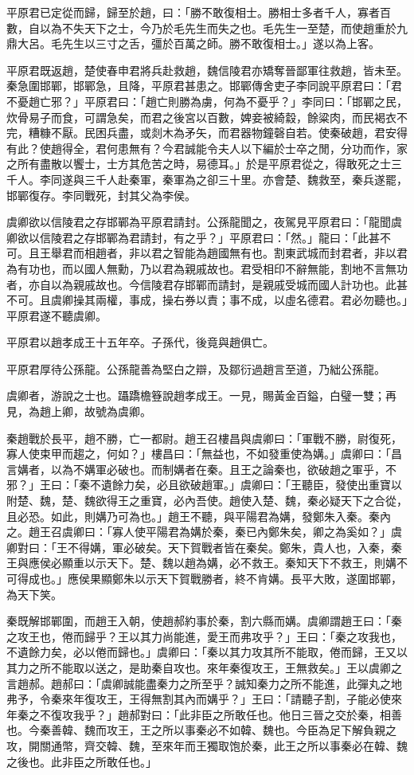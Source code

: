 \begin{pinyinscope}
平原君已定從而歸，歸至於趙，曰：「勝不敢復相士。勝相士多者千人，寡者百數，自以為不失天下之士，今乃於毛先生而失之也。毛先生一至楚，而使趙重於九鼎大呂。毛先生以三寸之舌，彊於百萬之師。勝不敢復相士。」遂以為上客。

平原君既返趙，楚使春申君將兵赴救趙，魏信陵君亦矯奪晉鄙軍往救趙，皆未至。秦急圍邯鄲，邯鄲急，且降，平原君甚患之。邯鄲傳舍吏子李同說平原君曰：「君不憂趙亡邪？」平原君曰：「趙亡則勝為虜，何為不憂乎？」李同曰：「邯鄲之民，炊骨易子而食，可謂急矣，而君之後宮以百數，婢妾被綺縠，餘粱肉，而民褐衣不完，糟糠不厭。民困兵盡，或剡木為矛矢，而君器物鐘磬自若。使秦破趙，君安得有此？使趙得全，君何患無有？今君誠能令夫人以下編於士卒之閒，分功而作，家之所有盡散以饗士，士方其危苦之時，易德耳。」於是平原君從之，得敢死之士三千人。李同遂與三千人赴秦軍，秦軍為之卻三十里。亦會楚、魏救至，秦兵遂罷，邯鄲復存。李同戰死，封其父為李侯。

虞卿欲以信陵君之存邯鄲為平原君請封。公孫龍聞之，夜駕見平原君曰：「龍聞虞卿欲以信陵君之存邯鄲為君請封，有之乎？」平原君曰：「然。」龍曰：「此甚不可。且王舉君而相趙者，非以君之智能為趙國無有也。割東武城而封君者，非以君為有功也，而以國人無勳，乃以君為親戚故也。君受相印不辭無能，割地不言無功者，亦自以為親戚故也。今信陵君存邯鄲而請封，是親戚受城而國人計功也。此甚不可。且虞卿操其兩權，事成，操右券以責；事不成，以虛名德君。君必勿聽也。」平原君遂不聽虞卿。

平原君以趙孝成王十五年卒。子孫代，後竟與趙俱亡。

平原君厚待公孫龍。公孫龍善為堅白之辯，及鄒衍過趙言至道，乃絀公孫龍。

虞卿者，游說之士也。躡蹻檐簦說趙孝成王。一見，賜黃金百鎰，白璧一雙；再見，為趙上卿，故號為虞卿。

秦趙戰於長平，趙不勝，亡一都尉。趙王召樓昌與虞卿曰：「軍戰不勝，尉復死，寡人使束甲而趨之，何如？」樓昌曰：「無益也，不如發重使為媾。」虞卿曰：「昌言媾者，以為不媾軍必破也。而制媾者在秦。且王之論秦也，欲破趙之軍乎，不邪？」王曰：「秦不遺餘力矣，必且欲破趙軍。」虞卿曰：「王聽臣，發使出重寶以附楚、魏，楚、魏欲得王之重寶，必內吾使。趙使入楚、魏，秦必疑天下之合從，且必恐。如此，則媾乃可為也。」趙王不聽，與平陽君為媾，發鄭朱入秦。秦內之。趙王召虞卿曰：「寡人使平陽君為媾於秦，秦已內鄭朱矣，卿之為奚如？」虞卿對曰：「王不得媾，軍必破矣。天下賀戰者皆在秦矣。鄭朱，貴人也，入秦，秦王與應侯必顯重以示天下。楚、魏以趙為媾，必不救王。秦知天下不救王，則媾不可得成也。」應侯果顯鄭朱以示天下賀戰勝者，終不肯媾。長平大敗，遂圍邯鄲，為天下笑。

秦既解邯鄲圍，而趙王入朝，使趙郝約事於秦，割六縣而媾。虞卿謂趙王曰：「秦之攻王也，倦而歸乎？王以其力尚能進，愛王而弗攻乎？」王曰：「秦之攻我也，不遺餘力矣，必以倦而歸也。」虞卿曰：「秦以其力攻其所不能取，倦而歸，王又以其力之所不能取以送之，是助秦自攻也。來年秦復攻王，王無救矣。」王以虞卿之言趙郝。趙郝曰：「虞卿誠能盡秦力之所至乎？誠知秦力之所不能進，此彈丸之地弗予，令秦來年復攻王，王得無割其內而媾乎？」王曰：「請聽子割，子能必使來年秦之不復攻我乎？」趙郝對曰：「此非臣之所敢任也。他日三晉之交於秦，相善也。今秦善韓、魏而攻王，王之所以事秦必不如韓、魏也。今臣為足下解負親之攻，開關通幣，齊交韓、魏，至來年而王獨取饱於秦，此王之所以事秦必在韓、魏之後也。此非臣之所敢任也。」


\end{pinyinscope}
